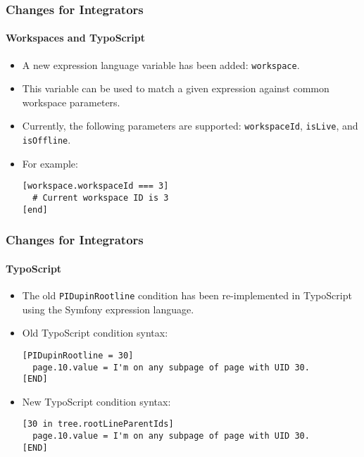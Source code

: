 \begin{frame}[fragile]
	\frametitle{Changes for Integrators}
	\framesubtitle{Workspaces and TypoScript}

	\lstset{basicstyle=\smaller\ttfamily}

	\begin{itemize}
		\item A new expression language variable has been added: \texttt{workspace}.
		\item This variable can be used to match a given expression against common workspace parameters.
		\item Currently, the following parameters are supported:\newline
			\small
				\texttt{workspaceId}, \texttt{isLive}, and \texttt{isOffline}.
			\normalsize
		\item For example:

\vspace{-0.4cm}
\begin{lstlisting}
[workspace.workspaceId === 3]
  # Current workspace ID is 3
[end]
\end{lstlisting}

	\end{itemize}

\end{frame}


\begin{frame}[fragile]
	\frametitle{Changes for Integrators}
	\framesubtitle{TypoScript}

	\lstset{basicstyle=\smaller\ttfamily}

	\begin{itemize}
		\item The old \texttt{PIDupinRootline} condition has been re-implemented
			in TypoScript using the Symfony expression language.
		\item Old TypoScript condition syntax:

\vspace{-0.4cm}
\begin{lstlisting}
[PIDupinRootline = 30]
  page.10.value = I'm on any subpage of page with UID 30.
[END]
\end{lstlisting}

		\item New TypoScript condition syntax:

\vspace{-0.4cm}
\begin{lstlisting}
[30 in tree.rootLineParentIds]
  page.10.value = I'm on any subpage of page with UID 30.
[END]
\end{lstlisting}

	\end{itemize}

\end{frame}

